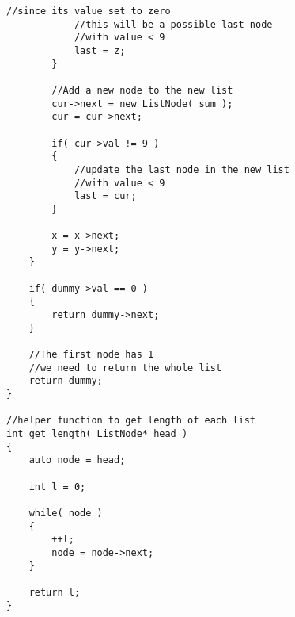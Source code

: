 \begin{lstlisting}[style=customc, caption={Record Last Non-Nine Node}]
            //since its value set to zero
            //this will be a possible last node
            //with value < 9
            last = z;
        }

        //Add a new node to the new list
        cur->next = new ListNode( sum );
        cur = cur->next;

        if( cur->val != 9 )
        {
            //update the last node in the new list
            //with value < 9
            last = cur;
        }

        x = x->next;
        y = y->next;
    }

    if( dummy->val == 0 )
    {
        return dummy->next;
    }

    //The first node has 1
    //we need to return the whole list
    return dummy;
}

//helper function to get length of each list
int get_length( ListNode* head )
{
    auto node = head;

    int l = 0;

    while( node )
    {
        ++l;
        node = node->next;
    }

    return l;
}

\end{lstlisting}


